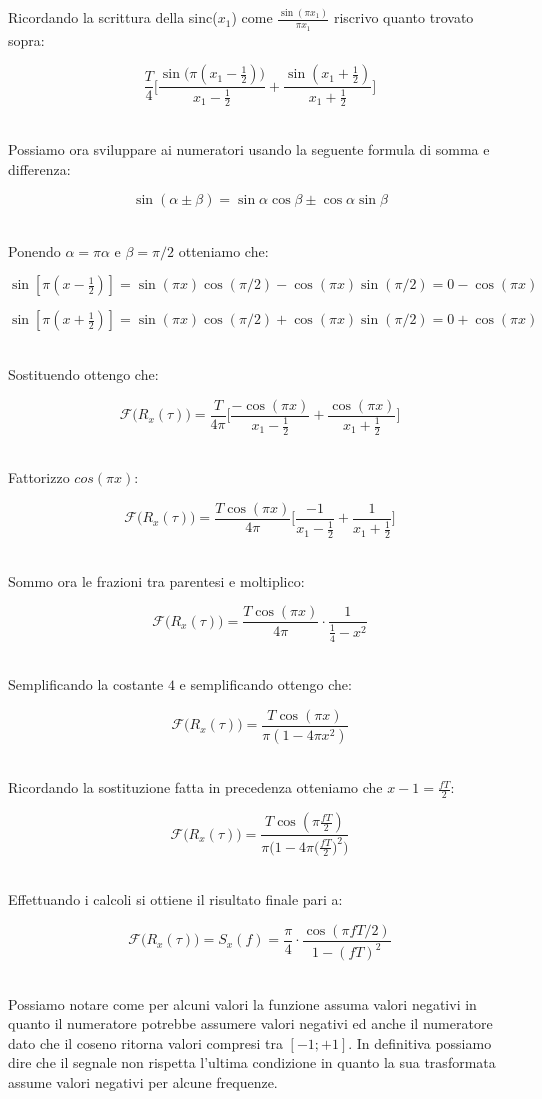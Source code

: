 \documentclass[../main.tex]{subfiles}
\begin{document}
Ricordando la scrittura della sinc($x_1$) come $\frac{\sin(\pi x_1)}{\pi x_1}$ riscrivo quanto trovato sopra:

\[ \frac{T}{4} \bigg[  \frac{\sin\big( \pi (x_1 - \tfrac{1}{2})\big)}{x_1 - \tfrac{1}{2}}  + \frac{\sin(x_1 + \tfrac{1}{2})}{x_1 + \tfrac{1}{2}}\bigg] \]\

Possiamo ora sviluppare ai numeratori usando la seguente formula di somma e differenza:

\[ \sin(\alpha \pm \beta) = \sin \alpha \cos \beta \pm \cos \alpha \sin \beta \]\ 

Ponendo $\alpha = \pi \alpha $ e $\beta = \pi/2$ otteniamo che:

\[ \sin[\pi (x - \tfrac{1}{2})] = \sin(\pi x) \cos(\pi/2) - \cos(\pi x) \sin(\pi/2) = 0 - \cos(\pi x)  \]

\[ \sin[\pi (x + \tfrac{1}{2})] = \sin(\pi x) \cos(\pi/2) + \cos(\pi x) \sin(\pi/2) = 0 + \cos(\pi x) \]\

Sostituendo ottengo che:

\[ \mathcal{F}\big(R_x(\tau)\big) = \frac{T}{4 \pi} \bigg[  \frac{-\cos(\pi x)}{x_1 - \tfrac{1}{2}}  + \frac{\cos(\pi x)}{x_1 + \tfrac{1}{2}} \bigg]  \]\

Fattorizzo $\unit{cos}(\pi x)$:

\[\mathcal{F}\big(R_x(\tau)\big) = \frac{T \cos(\pi x)}{4 \pi} \bigg[  \frac{-1}{x_1 - \tfrac{1}{2}}  + \frac{1}{x_1 + \tfrac{1}{2}} \bigg]  \]\

Sommo ora le frazioni tra parentesi e moltiplico:

\[ \mathcal{F}\big(R_x(\tau)\big) = \frac{T \cos(\pi x)}{4 \pi} \cdot \frac{1}{\tfrac{1}{4} - x^2} \]\

Semplificando la costante $4$ e semplificando ottengo che:


\[ \mathcal{F}\big(R_x(\tau)\big) = \frac{T \cos(\pi x)}{\pi (1 - 4\pi x^2) } \]\

Ricordando la sostituzione fatta in precedenza otteniamo che $x-1 = \tfrac{fT}{2}$:


\[ \mathcal{F}\big(R_x(\tau)\big) = \frac{T \cos(\pi \tfrac{fT}{2})}{\pi \big(1 - 4\pi \big(\tfrac{fT}{2}\big)^2\big) } \]\

Effettuando i calcoli si ottiene il risultato finale pari a:


\[ \mathcal{F}\big(R_x(\tau)\big) = S_x(f)  = \frac{\pi}{4} \cdot \frac{\cos(\pi fT / 2)}{ 1 - (fT)^2 } \]\

Possiamo notare come per alcuni valori la funzione assuma valori negativi in quanto il numeratore potrebbe assumere valori negativi ed anche il numeratore dato che il coseno ritorna valori compresi tra $[-1; +1]$.
In definitiva possiamo dire che il segnale non rispetta l'ultima condizione in quanto la sua trasformata assume valori negativi per alcune frequenze.
\end{document}
